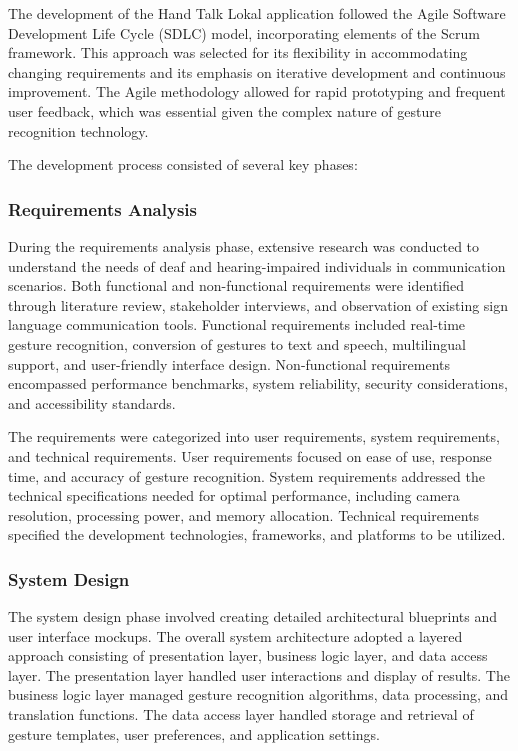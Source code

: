 \documentclass[12pt]{article}
\begin{document}
The development of the Hand Talk Lokal application followed the Agile Software Development Life Cycle (SDLC) model, incorporating elements of the Scrum framework. This approach was selected for its flexibility in accommodating changing requirements and its emphasis on iterative development and continuous improvement. The Agile methodology allowed for rapid prototyping and frequent user feedback, which was essential given the complex nature of gesture recognition technology.

The development process consisted of several key phases:

\subsubsection{Requirements Analysis}

During the requirements analysis phase, extensive research was conducted to understand the needs of deaf and hearing-impaired individuals in communication scenarios. Both functional and non-functional requirements were identified through literature review, stakeholder interviews, and observation of existing sign language communication tools. Functional requirements included real-time gesture recognition, conversion of gestures to text and speech, multilingual support, and user-friendly interface design. Non-functional requirements encompassed performance benchmarks, system reliability, security considerations, and accessibility standards.

The requirements were categorized into user requirements, system requirements, and technical requirements. User requirements focused on ease of use, response time, and accuracy of gesture recognition. System requirements addressed the technical specifications needed for optimal performance, including camera resolution, processing power, and memory allocation. Technical requirements specified the development technologies, frameworks, and platforms to be utilized.

\subsubsection{System Design}

The system design phase involved creating detailed architectural blueprints and user interface mockups. The overall system architecture adopted a layered approach consisting of presentation layer, business logic layer, and data access layer. The presentation layer handled user interactions and display of results. The business logic layer managed gesture recognition algorithms, data processing, and translation functions. The data access layer handled storage and retrieval of gesture templates, user preferences, and application settings.
\end{document}
